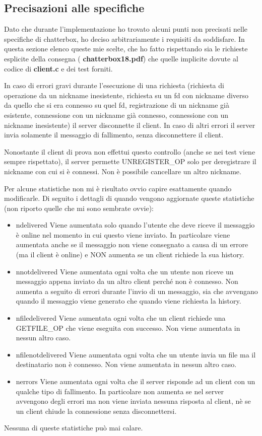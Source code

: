 \documentclass[a4paper]{article}
\theoremstyle{theorem}
\theoremstyle{remark}
\theoremstyle{definition}
\theoremstyle{corollary}
\theoremstyle{lemma}
\newcommand\file[1]{%
	\textbf{#1}}
\begin{document}
\subsection{Precisazioni alle specifiche}
Dato che durante l'implementazione ho trovato alcuni punti non precisati nelle specifiche di chatterbox, ho deciso arbitrariamente i requisiti da soddisfare. In questa sezione elenco queste mie scelte, che ho fatto rispettando sia le richieste esplicite della consegna (\file{chatterbox18.pdf}) che quelle implicite dovute al codice di \file{client.c} e dei test forniti.

In caso di errori gravi durante l'esecuzione di una richiesta (richiesta di operazione da un nickname inesistente, richiesta su un fd con nickname diverso da quello che si era connesso su quel fd, registrazione di un nickname già esistente, connessione con un nickname già connesso, connessione con un nickname inesistente) il server disconnette il client. In caso di altri errori il server invia solamente il messaggio di fallimento, senza disconnettere il client.

Nonostante il client di prova non effettui questo controllo (anche se nei test viene sempre rispettato), il server permette UNREGISTER\_OP solo per deregistrare il nickname con cui si è connessi. Non è possibile cancellare un altro nickname.

Per alcune statistiche non mi è risultato ovvio capire esattamente quando modificarle. Di seguito i dettagli di quando vengono aggiornate queste statistiche (non riporto quelle che mi sono sembrate ovvie):
\begin{itemize}
	\item{ndelivered} Viene aumentata solo quando l'utente che deve riceve il messaggio è online nel momento in cui questo viene inviato. In particolare viene aumentata anche se il messaggio non viene consegnato a causa di un errore (ma il client è online) e NON aumenta se un client richiede la sua history.
	\item{nnotdelivered} Viene aumentata ogni volta che un utente non riceve un messaggio appena inviato da un altro client perché non è connesso. Non aumenta a seguito di errori durante l'invio di un messaggio, sia che avvengano quando il messaggio viene generato che quando viene richiesta la history.
	\item{nfiledelivered} Viene aumentata ogni volta che un client richiede una GETFILE\_OP che viene eseguita con successo. Non viene aumentata in nessun altro caso.
	\item{nfilenotdelivered} Viene aumentata ogni volta che un utente invia un file ma il destinatario non è connesso. Non viene aumentata in nessun altro caso.
	\item{nerrors} Viene aumentata ogni volta che il server risponde ad un client con un qualche tipo di fallimento. In particolare non aumenta se nel server avvengono degli errori ma non viene inviata nessuna risposta al client, nè se un client chiude la connessione senza disconnettersi.
\end{itemize}
Nessuna di queste statistiche può mai calare.
\end{document}

